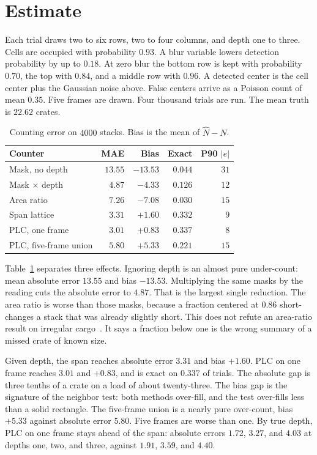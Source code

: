 \documentclass[10pt]{article}
\begin{document}
\section{Estimate}
Each trial draws two to six rows, two to four columns, and depth one to three. Cells are occupied with probability $0.93$. A blur variable lowers detection probability by up to $0.18$. At zero blur the bottom row is kept with probability $0.70$, the top with $0.84$, and a middle row with $0.96$. A detected center is the cell center plus the Gaussian noise above. False centers arrive as a Poisson count of mean $0.35$. Five frames are drawn. Four thousand trials are run. The mean truth is $22.62$ crates.

\begin{table}[t]
\caption{Counting error on $4000$ stacks. Bias is the mean of $\hat N-N$.}
\label{tab:count}
\centering
\footnotesize
\setlength{\tabcolsep}{2.6pt}
\begin{tabular}{@{}lrrrr@{}}
\toprule
Counter & MAE & Bias & Exact & P90 $|e|$ \\
\midrule
Mask, no depth & $13.55$ & $-13.53$ & $0.044$ & $31$ \\
Mask $\times$ depth & $4.87$ & $-4.33$ & $0.126$ & $12$ \\
Area ratio & $7.26$ & $-7.08$ & $0.030$ & $15$ \\
Span lattice & $3.31$ & $+1.60$ & $0.332$ & $9$ \\
PLC, one frame & $3.01$ & $+0.83$ & $0.337$ & $8$ \\
PLC, five-frame union & $5.80$ & $+5.33$ & $0.221$ & $15$ \\
\bottomrule
\end{tabular}
\end{table}

Table~\ref{tab:count} separates three effects. Ignoring depth is an almost pure under-count: mean absolute error $13.55$ and bias $-13.53$. Multiplying the same masks by the reading cuts the absolute error to $4.87$. That is the largest single reduction. The area ratio is worse than those masks, because a fraction centered at $0.86$ short-changes a stack that was already slightly short. This does not refute an area-ratio result on irregular cargo~\cite{hu2025}. It says a fraction below one is the wrong summary of a missed crate of known size.

Given depth, the span reaches absolute error $3.31$ and bias $+1.60$. PLC on one frame reaches $3.01$ and $+0.83$, and is exact on $0.337$ of trials. The absolute gap is three tenths of a crate on a load of about twenty-three. The bias gap is the signature of the neighbor test: both methods over-fill, and the test over-fills less than a solid rectangle. The five-frame union is a nearly pure over-count, bias $+5.33$ against absolute error $5.80$. Five frames are worse than one. By true depth, PLC on one frame stays ahead of the span: absolute errors $1.72$, $3.27$, and $4.03$ at depths one, two, and three, against $1.91$, $3.59$, and $4.40$.
\end{document}
